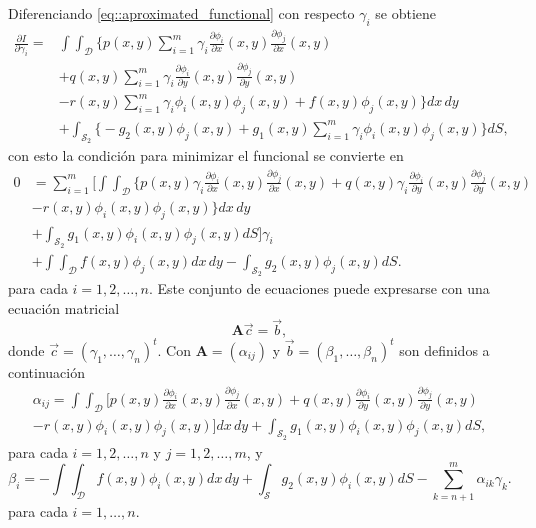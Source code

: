 \documentclass[a4paper]{article}
\begin{document}
Diferenciando \ref{eq::aproximated_functional} con respecto $\gamma_i$ se obtiene
\begin{equation}
\begin{aligned}
\frac{\partial I}{\partial \gamma_i}=&\int \int_{\mathcal{D}}\Bigg\{p(x,y)\sum_{i=1}^m \gamma_i\frac{\partial \phi_i}{\partial x}(x,y)\frac{\partial \phi_j}{\partial x}(x,y)\\
& + q(x,y)\sum_{i=1}^{m}\gamma_i\frac{\partial \phi_i}{\partial y}(x,y)\frac{\partial \phi_j}{\partial y}(x,y)\\
& - r(x,y)\sum_{i=1}^{m}\gamma_i \phi_i(x,y)\phi_j(x,y)+f(x,y)\phi_j(x,y)\Bigg\}dx\,dy\\
& + \int_{\mathcal{S}_2}\Bigg\{-g_2(x,y)\phi_j(x,y)+g_1(x,y)\sum_{i=1}^m \gamma_i \phi_i(x,y)\phi_j(x,y)\Bigg\}dS,
\end{aligned}
\end{equation}
con esto la condición para minimizar el funcional se convierte en 
\begin{equation}
\begin{aligned}
0&=\sum_{i=1}^m \Bigg[\int \int_{\mathcal{D}}\Bigg\{ p(x,y) \gamma_i\frac{\partial \phi_i}{\partial x}(x,y)\frac{\partial \phi_j}{\partial x}(x,y)+ q(x,y) \gamma_i\frac{\partial \phi_i}{\partial y}(x,y)\frac{\partial \phi_j}{\partial y}(x,y)\\
&-r(x,y)\phi_i(x,y)\phi_j(x,y)\Bigg\}dx\,dy\\
&+ \int_{\mathcal{S}_2}g_1(x,y)\phi_i(x,y)\phi_j(x,y)dS\Bigg]\gamma_i\\
&+ \int\int_{\mathcal{D}} f(x,y)\phi_j(x,y)dx\,dy-\int_{\mathcal{S}_2} g_2(x,y)\phi_j(x,y)dS.
\end{aligned}
\end{equation}
para cada $i=1,2,\hdots,n$. Este conjunto de ecuaciones puede expresarse con una ecuación matricial
\begin{equation}
\mathbf{A}\vec{c}=\vec{b},
\end{equation}
donde $\vec{c}=(\gamma_1,\hdots,\gamma_n)^t$. Con $\mathbf{A}=(\alpha_{ij})$ y $\vec{b}=(\beta_1,\hdots,\beta_n)^t$ son definidos a continuación
\begin{equation}\label{eq::alpha_ij}
\begin{aligned}
\alpha_{ij}=\int\int_{\mathcal{D}}\Bigg[ p(x,y)\frac{\partial \phi_i}{\partial x}(x,y)\frac{\partial \phi_j}{\partial x}(x,y)+ q(x,y)\frac{\partial \phi_i}{\partial y}(x,y)\frac{\partial \phi_j}{\partial y}(x,y)\\
-r(x,y)\phi_i(x,y)\phi_j(x,y)\Bigg] dx\,dy+\int_{\mathcal{S}_2} g_1(x,y)\phi_i(x,y)\phi_j(x,y)dS,
\end{aligned}
\end{equation}
para cada $i=1,2,\hdots,n$ y $j=1,2,\hdots,m$, y
\begin{equation}\label{eq::beta_i}
\beta_i=-\int\int_{\mathcal{D}}f(x,y)\phi_i(x,y) dx\,dy+\int_{\mathcal{S}} g_2(x,y)\phi_i(x,y)dS-\sum_{k=n+1}^m\alpha_{ik}\gamma_k.
\end{equation}
para cada $i=1,\hdots,n$.\\
\end{document}
